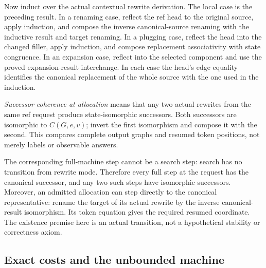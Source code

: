 Now induct over the actual contextual rewrite derivation. The local case is
the preceding result. In a renaming case, reflect the ref head to the original
source, apply induction, and compose the inverse canonical-source renaming
with the inductive result and target renaming. In a plugging case, reflect
the head into the changed filler, apply induction, and compose replacement
associativity with state congruence. In an expansion case, reflect into the
selected component and use the proved expansion-result interchange. In each
case the head's edge equality identifies the canonical replacement of the
whole source with the one used in the induction.


\emph{Successor coherence at allocation} means that any two actual rewrites
from the same ref request produce state-isomorphic successors. Both successors
are isomorphic to $C(G,e,v)$; invert the first isomorphism and compose it with
the second. This compares complete output graphs and resumed token positions,
not merely labels or observable answers.


The corresponding full-machine step cannot be a search step: search has no
transition from rewrite mode. Therefore every full step at the request has
the canonical successor, and any two such steps have isomorphic successors.
Moreover, an admitted allocation can step directly to the canonical
representative: rename the target of its actual rewrite by the inverse
canonical-result isomorphism. Its token equation gives the required resumed
coordinate. The existence premise here is an actual transition, not a
hypothetical stability or correctness axiom.




\subsection{Exact costs and the unbounded machine}

